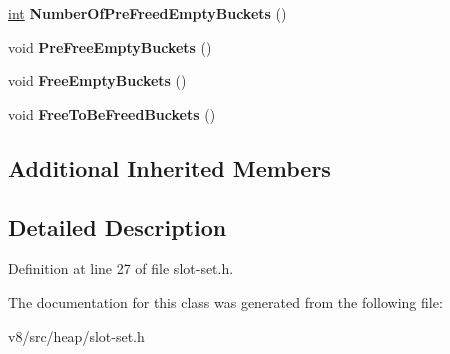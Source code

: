 \begin{DoxyCompactItemize}
\item 
\mbox{\label{classv8_1_1internal_1_1SlotSet_a0bd413da3d0dba3cb0c54e0754453307}} 
\mbox{\hyperlink{classint}{int}} {\bfseries Number\+Of\+Pre\+Freed\+Empty\+Buckets} ()
\item 
\mbox{\label{classv8_1_1internal_1_1SlotSet_aaf4aade22905a8419144e22694602d02}} 
void {\bfseries Pre\+Free\+Empty\+Buckets} ()
\item 
\mbox{\label{classv8_1_1internal_1_1SlotSet_a7df6ab804bef841d417b18ab36df271b}} 
void {\bfseries Free\+Empty\+Buckets} ()
\item 
\mbox{\label{classv8_1_1internal_1_1SlotSet_a2b7af555951328472f307d102932bc98}} 
void {\bfseries Free\+To\+Be\+Freed\+Buckets} ()
\end{DoxyCompactItemize}
\subsection*{Additional Inherited Members}


\subsection{Detailed Description}


Definition at line 27 of file slot-\/set.\+h.



The documentation for this class was generated from the following file\+:\begin{DoxyCompactItemize}
\item 
v8/src/heap/slot-\/set.\+h\end{DoxyCompactItemize}
